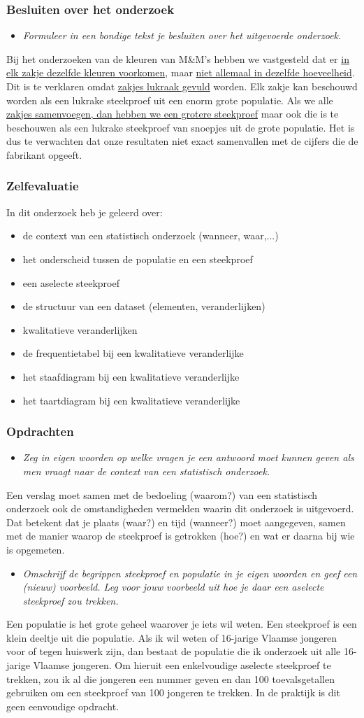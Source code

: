\documentclass[dutch]{beamer}
\newcommand{\vraag}[1]{\begin{itemize}\item {\it #1}\end{itemize}}
\begin{document}
\begin{frame}
\frametitle{Besluiten over het onderzoek}
\vraag{Formuleer in een bondige tekst je besluiten over het uitgevoerde onderzoek.}
\pause
Bij het onderzoeken van de kleuren van M\&M’s hebben we vastgesteld dat er \uline{in elk zakje
dezelfde kleuren voorkomen}, maar \uline{niet allemaal in dezelfde hoeveelheid}. Dit is te verklaren
omdat \uline{zakjes lukraak gevuld} worden. Elk zakje kan beschouwd worden als een lukrake
steekproef uit een enorm grote populatie. Als we alle \uline{zakjes samenvoegen, dan hebben we
een grotere steekproef} maar ook die is te beschouwen als een lukrake steekproef van snoepjes
uit de grote populatie. Het is dus te verwachten dat onze resultaten niet exact samenvallen
met de cijfers die de fabrikant opgeeft.
\end{frame}

\begin{frame}
\frametitle{Zelfevaluatie}
In dit onderzoek heb je geleerd over:\\
\begin{itemize}
  \item de context van een statistisch onderzoek (wanneer, waar,...)
  \item het onderscheid tussen de populatie en een steekproef
  \item een aselecte steekproef
  \item de structuur van een dataset (elementen, veranderlijken)
  \item kwalitatieve veranderlijken
  \item de frequentietabel bij een kwalitatieve veranderlijke
  \item het staafdiagram bij een kwalitatieve veranderlijke
  \item het taartdiagram bij een kwalitatieve veranderlijke
\end{itemize}
\end{frame}

\begin{frame}
\frametitle{Opdrachten}
\vraag{Zeg in eigen woorden op welke vragen je een antwoord moet kunnen geven als men vraagt
naar de context van een statistisch onderzoek.}
\pause
Een verslag moet samen met de bedoeling (waarom?) van een statistisch onderzoek ook de
omstandigheden vermelden waarin dit onderzoek is uitgevoerd. Dat betekent dat je plaats
(waar?) en tijd (wanneer?) moet aangegeven, samen met de manier waarop de steekproef is
getrokken (hoe?) en wat er daarna bij wie is opgemeten.
\pause
\vraag{Omschrijf de begrippen steekproef en populatie in je eigen woorden en geef een (nieuw)
voorbeeld. Leg voor jouw voorbeeld uit hoe je daar een aselecte steekproef zou
trekken.}
\pause
Een populatie is het grote geheel waarover je iets wil weten. Een steekproef is een klein
deeltje uit die populatie. Als ik wil weten of 16-jarige Vlaamse jongeren voor of tegen
huiswerk zijn, dan bestaat de populatie die ik onderzoek uit alle 16-jarige Vlaamse jongeren.
Om hieruit een enkelvoudige aselecte steekproef te trekken, zou ik al die jongeren een
nummer geven en dan 100 toevalsgetallen gebruiken om een steekproef van 100 jongeren te
trekken. In de praktijk is dit geen eenvoudige opdracht.
\end{frame}
\end{document}
